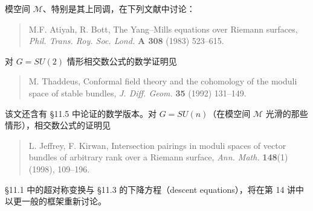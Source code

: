 模空间 $\mathcal{M}$、特别是其上同调，在下列文献中讨论：
\begin{quote}
  M.F. Atiyah, R. Bott, The Yang--Mills equations over Riemann surfaces, \emph{Phil. Trans. Roy. Soc. Lond.} \textbf{A 308} (1983) 523--615.
\end{quote}

对 $G=SU(2)$ 情形相交数公式的数学证明见
\begin{quote}
  M. Thaddeus, Conformal field theory and the cohomology of the moduli space of stable bundles, \emph{J. Diff. Geom.} \textbf{35} (1992) 131--149.
\end{quote}

该文还含有 §11.5 中论证的数学版本。对 $G=SU(n)$（在模空间 $\mathcal{M}$ 光滑的那些情形），相交数公式的证明见
\begin{quote}
  L. Jeffrey, F. Kirwan, Intersection pairings in moduli spaces of vector bundles of arbitrary rank over a Riemann surface, \emph{Ann. Math.} \textbf{148}(1) (1998), 109--196.
\end{quote}

§11.1 中的超对称变换与 §11.3 的下降方程（descent equations），将在第 14 讲中以更一般的框架重新讨论。
